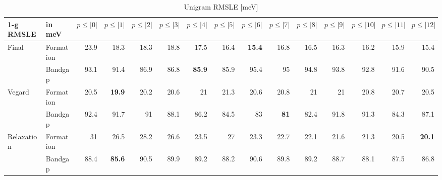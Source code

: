 \documentclass[11pt,oneside,czech,american]{book} %
\theoremstyle{definition} %
\theoremstyle{definition}
\begin{document}
\begin{table}[H]
	\scriptsize
	\centering
\begin{tabular}{llrrrrrrrrrrrrr}
	\hline
	1-g RMSLE   & in meV   &   $p{\leq}|0|$ &   $p{\leq}|1|$ &   $p{\leq}|2|$ &   $p{\leq}|3|$ &   $p{\leq}|4|$ &   $p{\leq}|5|$ &   $p{\leq}|6|$ &   $p{\leq}|7|$ &   $p{\leq}|8|$ &   $p{\leq}|9|$ &   $p{\leq}|10|$ &   $p{\leq}|11|$ &   $p{\leq}|12|$ \\
	\hline
	\multirow{2}{*}{Final}       & Formation &       23.9 &       18.3 &       18.3 &       18.8 &       17.5 &       16.4 &       \textbf{15.4} &       16.8 &       16.5 &       16.3 &        16.2 &        15.9 &        15.4 \\
	       & Bandgap   &       93.1 &       91.4 &       86.9 &       86.8 &       \textbf{85.9} &       85.9 &       95.4 &       95   &       94.8 &       93.8 &        92.8 &        91.6 &        90.5 \\
	\multirow{2}{*}{Vegard}      & Formation &       20.5 &       \textbf{19.9} &       20.2 &       20.6 &       21   &       21.3 &       20.6 &       20.8 &       21   &       21   &        20.8 &        20.7 &        20.5 \\
	      & Bandgap   &       92.4 &       91.7 &       91   &       88.1 &       86.2 &       84.5 &       83   &       \textbf{81}   &       82.4 &       91.8 &        91.3 &        84.3 &        87.1 \\
	\multirow{2}{*}{Relaxation}  & Formation &       31   &       26.5 &       28.2 &       26.6 &       23.5 &       27   &       23.3 &       22.7 &       22.1 &       21.6 &        21.3 &        20.5 &        \textbf{20.1} \\
	  & Bandgap   &       88.4 &       \textbf{85.6} &       90.5 &       89.9 &       89.2 &       88.2 &       90.6 &       89.8 &       89.2 &       88.7 &        88.1 &        87.5 &        86.8 \\
	\hline
\end{tabular}
	\caption{Unigram RMSLE [meV]}
	\label{1-g RMSLE hat}
\end{table}
\end{document}
